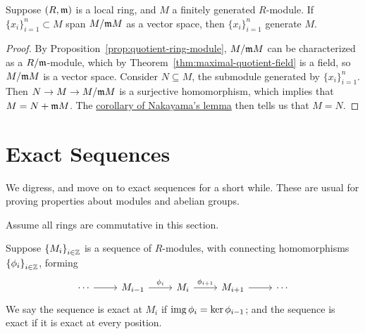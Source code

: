 \begin{theorem}
    Suppose \((R,\mathfrak{m})\) is a local ring,
    and \(M\) a finitely generated \(R\)-module.
    If \({\{x_i\}}_{i=1}^n \subset M\) span \(M/\mathfrak{m}M\) as a vector space,
    then \({\{x_i\}}_{i=1}^n\) generate \(M\).
\end{theorem}
\begin{proof}
    By Proposition~\ref{prop:quotient-ring-module},
    \(M/\mathfrak{m}M\) can be characterized as a \(R/\mathfrak{m}\)-module,
    which by Theorem~\ref{thm:maximal-quotient-field} is a field,
    so \(M/\mathfrak{m}M\) is a vector space.
    Consider \(N \subseteq M\), the submodule generated by \({\{x_i\}}_{i=1}^n\).
    Then \(N \to M \to M/\mathfrak{m}M\) is a surjective homomorphism,
    which implies that \(M = N + \mathfrak{m}M\).
    The \hyperref[cor:nakayama-quotient]{corollary of Nakayama's lemma}
    then tells us that \(M = N\).
\end{proof}


\section{Exact Sequences}\label{sec:exact-sequence}

\begin{remark}
    We digress, and move on to exact sequences for a short while.
    These are usual for proving properties about modules and abelian groups.
\end{remark}
\begin{remark}
    Assume all rings are commutative in this section.
\end{remark}

\begin{definition}
    Suppose \({\{M_i\}}_{i\in\mathbb{Z}}\) is a sequence of \(R\)-modules,
    with connecting homomorphisms \({\{\phi_i\}}_{i\in\mathbb{Z}}\), forming
    \begin{equation*}
        \begin{tikzcd}
            \cdots \arrow{r} & M_{i-1} \arrow{r}{\phi_i} &
            M_i \arrow{r}{\phi_{i+1}} & M_{i+1} \arrow{r} & \cdots
        \end{tikzcd}
    \end{equation*}
    We say the sequence is exact at \(M_i\) if \(\operatorname{img}\phi_i = \ker\phi_{i-1}\);
    and the sequence is exact if it is exact at every position.
\end{definition}

